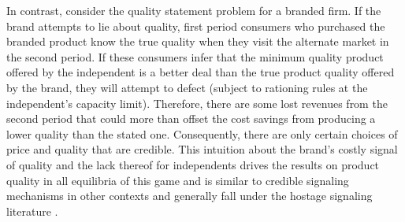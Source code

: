 \documentclass[mksc,blindrev]{informs3} %
\begin{document}
In contrast, consider the quality statement problem for a branded firm. If the brand attempts to lie about quality, first period consumers who purchased the branded product  know the true quality when they visit the alternate market in the second period. If these consumers infer that the minimum quality product offered by the independent is a better deal than the true product quality offered by the brand, they will attempt to defect (subject to rationing rules at the independent's capacity limit). Therefore, there are some lost revenues from the second period that could more than offset the cost savings from producing a lower quality than the stated one. Consequently, there are only certain choices of price and quality that are credible. This intuition about the brand's costly signal of quality and the lack thereof for independents drives the results on product quality in all equilibria of this game and is similar to credible signaling mechanisms in other contexts \citep{spence1978job,milgrom1986price} and generally fall under the hostage signaling literature \citep{williamson1983credible}.
\end{document}
